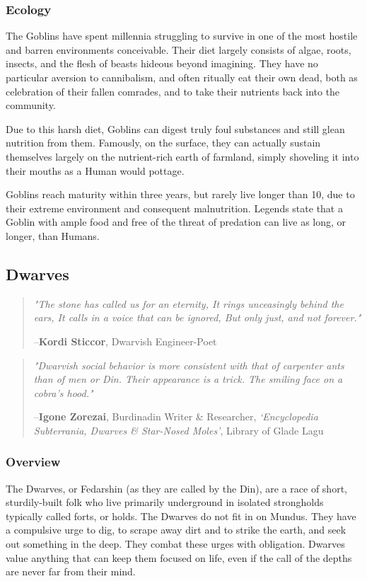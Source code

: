 \documentclass[oneside,11pt,english]{book}
\begin{document}
\subsubsection*{Ecology} 
The Goblins have spent millennia struggling to survive in one of the most hostile and barren 
environments conceivable. Their diet largely consists of algae, roots, insects, and the flesh of beasts 
hideous beyond imagining. They have no particular aversion to cannibalism, and often ritually eat their 
own dead, both as celebration of their fallen comrades, and to take their nutrients back into the 
community. 

 
Due to this harsh diet, Goblins can digest truly foul substances and still glean nutrition from them. 
Famously, on the surface, they can actually sustain themselves largely on the nutrient-rich earth of 
farmland, simply shoveling it into their mouths as a Human would pottage. 
 

Goblins reach maturity within three years, but rarely live longer than 10, due to their extreme 
environment and consequent malnutrition. Legends state that a Goblin with ample food and free of the 
threat of predation can live as long, or longer, than Humans. 
\subsection{Dwarves}
\begin{quotation}
	\emph{"The stone has called us for an eternity,	It rings unceasingly behind the ears, 	It calls in a voice that can be ignored, 	But only just, and not forever."}

	\hfill--\textbf{Kordi Sticcor}, Dwarvish Engineer-Poet 
\end{quotation}
\begin{quotation}
	\emph{"Dwarvish social behavior is more consistent with that of carpenter ants than of men or Din. Their appearance is a trick. The smiling face on a cobra's hood."}

	\hfill--\textbf{Igone Zorezai}, Burdinadin Writer \& Researcher, \textit{‘Encyclopedia Subterrania, Dwarves \& Star-Nosed Moles’}, Library of Glade Lagu 
\end{quotation}
\subsubsection*{Overview} 
The Dwarves, or Fedarshin (as they are called by the Din), are a race of short, sturdily-built folk who live 
primarily underground in isolated strongholds typically called forts, or holds. The Dwarves do not fit in 
on Mundus. They have a compulsive urge to dig, to scrape away dirt and to strike the earth, and seek out 
something in the deep. They combat these urges with obligation. Dwarves value anything that can keep 
them focused on life, even if the call of the depths are never far from their mind. 
\end{document}
